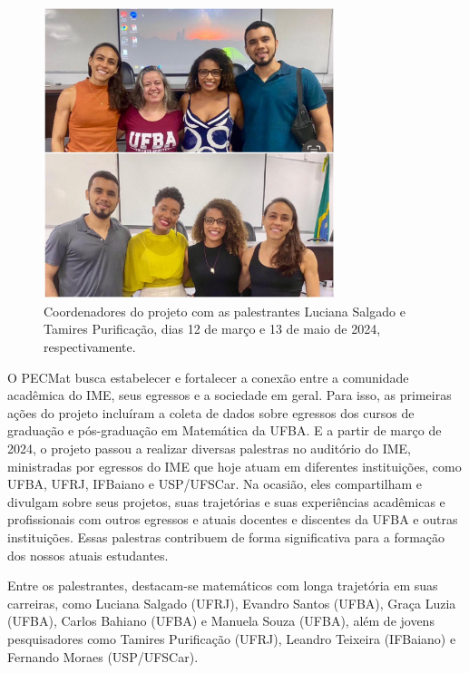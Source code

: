\documentclass{hipatia}
\begin{document}
\begin{figure}[htb]
    \centering
    \includegraphics[width=8.5cm]{pecmat1.jpeg}
    \caption{Coordenadores do projeto com as palestrantes Luciana Salgado  e Tamires Purificação, dias 12 de março e 13 de maio de 2024, respectivamente.} %
 \label{PECMat1}
\end{figure}
%

O PECMat busca estabelecer e fortalecer a conexão  entre a comunidade acadêmica do IME, seus egressos e a sociedade em geral. Para isso, as primeiras ações do projeto incluíram a coleta de dados sobre egressos dos cursos de graduação e pós-graduação em Matemática da UFBA.  E a partir de março de 2024, o projeto passou a realizar diversas palestras no auditório do IME, ministradas por egressos do IME que hoje atuam em diferentes instituições, como UFBA, UFRJ, IFBaiano e USP/UFSCar. Na ocasião, eles compartilham e divulgam sobre seus projetos, suas trajetórias e suas experiências acadêmicas e profissionais com outros egressos e atuais docentes e discentes da UFBA e outras instituições. Essas palestras contribuem de forma significativa para a formação dos nossos atuais estudantes.

Entre os palestrantes, destacam-se  matemáticos com longa trajetória em suas carreiras, como Luciana Salgado (UFRJ), Evandro Santos (UFBA), Graça Luzia (UFBA), Carlos Bahiano (UFBA) e Manuela Souza (UFBA), além de jovens pesquisadores como Tamires Purificação (UFRJ), Leandro Teixeira (IFBaiano) e Fernando Moraes (USP/UFSCar).
\end{document}
